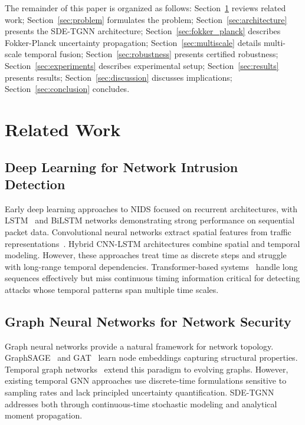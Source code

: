 \documentclass[10pt,journal,compsoc]{IEEEtran}
\begin{document}
The remainder of this paper is organized as follows: Section~\ref{sec:related} reviews related work; Section~\ref{sec:problem} formulates the problem; Section~\ref{sec:architecture} presents the SDE-TGNN architecture; Section~\ref{sec:fokker_planck} describes Fokker-Planck uncertainty propagation; Section~\ref{sec:multiscale} details multi-scale temporal fusion; Section~\ref{sec:robustness} presents certified robustness; Section~\ref{sec:experiments} describes experimental setup; Section~\ref{sec:results} presents results; Section~\ref{sec:discussion} discusses implications; Section~\ref{sec:conclusion} concludes.

\vspace{-0.2cm}
\section{Related Work}
\label{sec:related}

\vspace{-0.2cm}
\subsection{Deep Learning for Network Intrusion Detection}

Early deep learning approaches to NIDS focused on recurrent architectures, with LSTM~\cite{kim2016lstm} and BiLSTM networks demonstrating strong performance on sequential packet data. Convolutional neural networks extract spatial features from traffic representations~\cite{vinayakumar2017applying}. Hybrid CNN-LSTM architectures combine spatial and temporal modeling. However, these approaches treat time as discrete steps and struggle with long-range temporal dependencies. Transformer-based systems~\cite{vaswani2017attention} handle long sequences effectively but miss continuous timing information critical for detecting attacks whose temporal patterns span multiple time scales.

\vspace{-0.2cm}
\subsection{Graph Neural Networks for Network Security}

Graph neural networks provide a natural framework for network topology. GraphSAGE~\cite{hamilton2017inductive} and GAT~\cite{velivckovic2017graph} learn node embeddings capturing structural properties. Temporal graph networks~\cite{rossi2020temporal} extend this paradigm to evolving graphs. However, existing temporal GNN approaches use discrete-time formulations sensitive to sampling rates and lack principled uncertainty quantification. SDE-TGNN addresses both through continuous-time stochastic modeling and analytical moment propagation.
\end{document}
